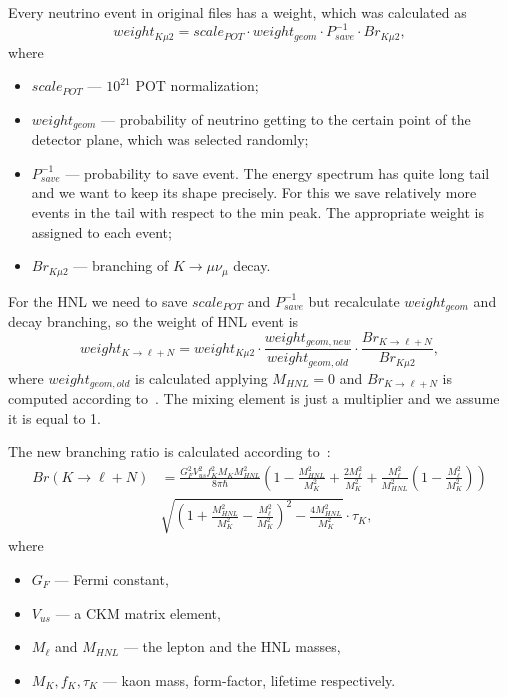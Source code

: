 \documentclass[../main.tex]{subfiles}
\begin{document}
Every neutrino event in original files has a weight, which was calculated as
\begin{equation}
    weight_{K\mu2}=scale_{POT}\cdot weight_{geom}\cdot P_{save}^{-1}\cdot Br_{K\mu2},
\end{equation}
where
\begin{itemize}
    \item $scale_{POT}$ --- $10^{21}$ POT normalization;
    \item $weight_{geom}$ --- probability of neutrino getting to the certain point of the detector plane, which was selected randomly;
    \item$P_{save}^{-1}$ --- probability to save event. The energy spectrum has quite long tail and we want to keep its shape precisely. For this we save relatively more events in the tail with respect to the min peak. The appropriate weight is assigned to each event;
    \item $Br_{K\mu2}$ --- branching of $K\rightarrow\mu\nu_{\mu}$ decay.
\end{itemize}

For the HNL we need to save $scale_{POT}$ and $P_{save}^{-1}$ but recalculate $weight_{geom}$ and decay branching, so the weight of HNL event is
\begin{equation}
    weight_{K\rightarrow \ell+N}=weight_{K\mu2}\cdot\frac{weight_{geom,new}}{weight_{geom,old}}\cdot \frac{Br_{K\rightarrow \ell+N}}{Br_{K\mu2}},
    \label{eq:HNL:weightDif}
\end{equation}
where $weight_{geom,old}$ is calculated applying $M_{HNL}=0$ and $Br_{K\rightarrow \ell+N}$ is computed according to~\cite{Gorbunov2007}. The mixing element is just a multiplier and we assume it is equal to 1.

The new branching ratio is calculated according to~\cite{Gorbunov2007}:
\begin{equation}
    \begin{split}
    Br(K\rightarrow \ell+N)&=\frac{G_F^2 V_{us}^2 f_K^2 M_K M_{HNL}^2}{8\pi\hbar}\left(1-\frac{M_{HNL}^2}{M_K^2}+\frac{2M_\ell ^2}{M_K^2}+\frac{M_\ell^2}{M_{HNL}^2}\left(1-\frac{M_\ell^2}{M_K^2}\right)\right) \\
&\sqrt{\left(1+\frac{M_{HNL}^2}{M_K^2}-\frac{M_\ell^2}{M_K^2}\right)^2-\frac{4M_{HNL}^2}{M_K^2}} \cdot\tau_K,
    \end{split}
    \label{eq:HNL:Kdecay}
\end{equation}
where
\begin{itemize}
\item $G_F$ --- Fermi constant,
\item $V_{us}$ --- a CKM matrix element,
\item $M_\ell$ and $M_{HNL}$ --- the lepton and the HNL masses,
\item $M_K, f_K, \tau_K$ --- kaon mass, form-factor, lifetime respectively.
\end{itemize}
\end{document}
